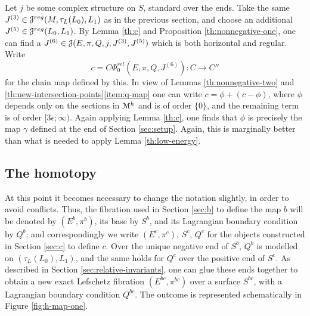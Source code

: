 \documentclass[10pt,letterpaper]{article}
\begin{document}
Let $j$ be some complex structure on $S$, standard over the ends. Take the same
$J^{(3)} \in \mathcal{J}^{reg}(M,\tau_L(L_0),L_1)$ as in the previous section, and choose
an additional $J^{(5)} \in \mathcal{J}^{reg}(L_0,L_1)$. By Lemma \ref{th:c} and
Proposition \ref{th:nonnegative-one}, one can find a $J^{(6)} \in
\mathcal{J}(E,\pi,Q,j,J^{(3)},J^{(5)})$ which is both horizontal and regular. Write
\[
c = C\Phi^{rel}_0(E,\pi,Q,J^{(6)}): C \longrightarrow C''
\]
for the chain map defined by this. In view of Lemmas \ref{th:nonnegative-two}
and \ref{th:new-intersection-points}\ref{item:q-map} one can write $c = \phi +
(c-\phi)$, where $\phi$ depends only on the sections in $\mathcal{M}^h$ and is of order
$\{0\}$, and the remaining term is of order $[3\epsilon;\infty)$. Again
applying Lemma \ref{th:c}, one finds that $\phi$ is precisely the map $\gamma$
defined at the end of Section \ref{sec:setup}. Again, this is marginally better
than what is needed to apply Lemma \ref{th:low-energy}.

%

\subsection{The homotopy\label{sec:h}}

At this point it becomes necessary to change the notation slightly, in order to
avoid conflicts. Thus, the fibration used in Section \ref{sec:b} to define the
map $b$ will be denoted by $(E^b,\pi^b)$, its base by $S^b$, and its Lagrangian
boundary condition by $Q^b$; and correspondingly we write $(E^c,\pi^c)$, $S^c$,
$Q^c$ for the objects constructed in Section \ref{sec:c} to define $c$. Over
the unique negative end of $S^b$, $Q^b$ is modelled on $(\tau_L(L_0),L_1)$, and
the same holds for $Q^c$ over the positive end of $S^c$. As described in
Section \ref{sec:relative-invariants}, one can glue these ends together to
obtain a new exact Lefschetz fibration $(E^{bc},\pi^{bc})$ over a surface
$S^{bc}$, with a Lagrangian boundary condition $Q^{bc}$. The outcome is
represented schematically in Figure \ref{fig:h-map-one}.
\end{document}
